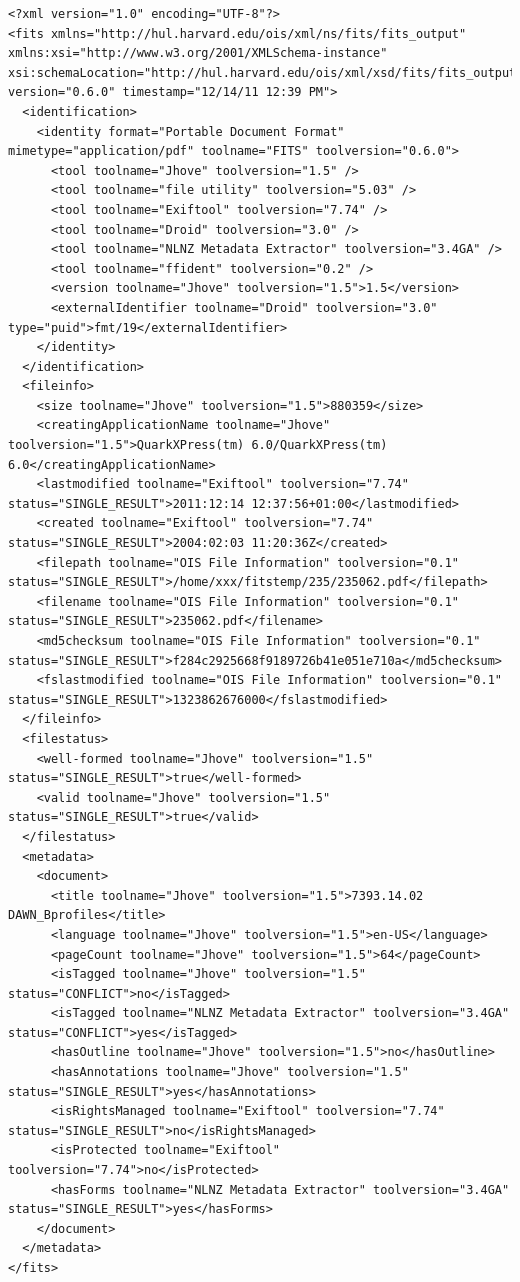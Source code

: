 \pagebreak
\lstset{
language=XML,
basicstyle=\tiny\ttfamily,
label=lst:fits_example,
caption=An example FITS output file}
\begin{lstlisting}
<?xml version="1.0" encoding="UTF-8"?>
<fits xmlns="http://hul.harvard.edu/ois/xml/ns/fits/fits_output" xmlns:xsi="http://www.w3.org/2001/XMLSchema-instance" xsi:schemaLocation="http://hul.harvard.edu/ois/xml/xsd/fits/fits_output.xsd" version="0.6.0" timestamp="12/14/11 12:39 PM">
  <identification>
    <identity format="Portable Document Format" mimetype="application/pdf" toolname="FITS" toolversion="0.6.0">
      <tool toolname="Jhove" toolversion="1.5" />
      <tool toolname="file utility" toolversion="5.03" />
      <tool toolname="Exiftool" toolversion="7.74" />
      <tool toolname="Droid" toolversion="3.0" />
      <tool toolname="NLNZ Metadata Extractor" toolversion="3.4GA" />
      <tool toolname="ffident" toolversion="0.2" />
      <version toolname="Jhove" toolversion="1.5">1.5</version>
      <externalIdentifier toolname="Droid" toolversion="3.0" type="puid">fmt/19</externalIdentifier>
    </identity>
  </identification>
  <fileinfo>
    <size toolname="Jhove" toolversion="1.5">880359</size>
    <creatingApplicationName toolname="Jhove" toolversion="1.5">QuarkXPress(tm) 6.0/QuarkXPress(tm) 6.0</creatingApplicationName>
    <lastmodified toolname="Exiftool" toolversion="7.74" status="SINGLE_RESULT">2011:12:14 12:37:56+01:00</lastmodified>
    <created toolname="Exiftool" toolversion="7.74" status="SINGLE_RESULT">2004:02:03 11:20:36Z</created>
    <filepath toolname="OIS File Information" toolversion="0.1" status="SINGLE_RESULT">/home/xxx/fitstemp/235/235062.pdf</filepath>
    <filename toolname="OIS File Information" toolversion="0.1" status="SINGLE_RESULT">235062.pdf</filename>
    <md5checksum toolname="OIS File Information" toolversion="0.1" status="SINGLE_RESULT">f284c2925668f9189726b41e051e710a</md5checksum>
    <fslastmodified toolname="OIS File Information" toolversion="0.1" status="SINGLE_RESULT">1323862676000</fslastmodified>
  </fileinfo>
  <filestatus>
    <well-formed toolname="Jhove" toolversion="1.5" status="SINGLE_RESULT">true</well-formed>
    <valid toolname="Jhove" toolversion="1.5" status="SINGLE_RESULT">true</valid>
  </filestatus>
  <metadata>
    <document>
      <title toolname="Jhove" toolversion="1.5">7393.14.02 DAWN_Bprofiles</title>
      <language toolname="Jhove" toolversion="1.5">en-US</language>
      <pageCount toolname="Jhove" toolversion="1.5">64</pageCount>
      <isTagged toolname="Jhove" toolversion="1.5" status="CONFLICT">no</isTagged>
      <isTagged toolname="NLNZ Metadata Extractor" toolversion="3.4GA" status="CONFLICT">yes</isTagged>
      <hasOutline toolname="Jhove" toolversion="1.5">no</hasOutline>
      <hasAnnotations toolname="Jhove" toolversion="1.5" status="SINGLE_RESULT">yes</hasAnnotations>
      <isRightsManaged toolname="Exiftool" toolversion="7.74" status="SINGLE_RESULT">no</isRightsManaged>
      <isProtected toolname="Exiftool" toolversion="7.74">no</isProtected>
      <hasForms toolname="NLNZ Metadata Extractor" toolversion="3.4GA" status="SINGLE_RESULT">yes</hasForms>
    </document>
  </metadata>
</fits>
\end{lstlisting}
\pagebreak

